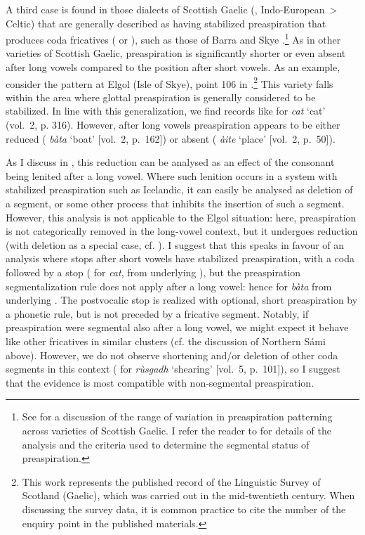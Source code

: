 \documentclass[output=paper,colorlinks,citecolor=brown]{langscibook}
\begin{document}
\largerpage
A third case is found in those dialects of Scottish Gaelic (, Indo\hyp European~> Celtic) that are generally described as having stabilized preaspiration that produces coda fricatives (\ipa{[h]} or \ipa{[x]}), such as those of Barra and Skye \parencite{borgstrøm1937barra, borgstrøm1941skye}.\footnote{See \textcite{bosch06:_revis_preas, omaolalaigh10} for a discussion of the range of variation in preaspiration patterning across varieties of Scottish Gaelic. I refer the reader to \textcite{iosad2019gaelic, iosad2020phonological} for details of the analysis and the criteria used to determine the segmental status of preaspiration.} As in other varieties of Scottish Gaelic, preaspiration is significantly shorter or even absent after long vowels compared to the position after short vowels. As an example, consider the pattern at Elgol (Isle of Skye), point 106 in  \textcite{sgds}.\footnote{This work represents the published record of the Linguistic Survey of Scotland (Gaelic), which was carried out in the mid-twentieth century. When discussing the survey data, it is common practice to cite the number of the enquiry point in the published materials.} This variety falls within the area where glottal preaspiration is generally considered to be  stabilized. In line with this generalization, we find records like  for \textit{cat} `cat' (vol.~2, p. 316). However, after long vowels preaspiration appears to be either reduced ( \textit{bàta} `boat' [vol.~2, p.~162]) or absent ( \textit{àite} `place' [vol.~2, p.~50]).

As I discuss in \textcite{iosad2020phonological}, this reduction can be analysed as an effect of the consonant being lenited after a long vowel. Where such lenition occurs in a system with stabilized preaspiration such as Icelandic, it can easily be analysed as deletion of a \ipa{[h]} segment, or some other process that inhibits the insertion of such a segment. However, this analysis is not applicable to the Elgol situation: here, preaspiration is not categorically removed in the long\hyp vowel context, but it undergoes reduction (with deletion as a special case, cf. \citealt{hejná2019pre}). I suggest that this speaks in favour of an analysis where stops after short vowels have stabilized preaspiration, with a coda \ipa{[h]} followed by a stop (\ipa{[kʰaht]} for \textit{cat}, from underlying ), but the preaspiration segmentalization rule does not apply after a long vowel: hence \ipa{[paːtʰə]} for \textit{bàta} from underlying . The postvocalic {\VOICELESS} stop is realized with optional, short preaspiration by a phonetic rule, but is not preceded by a fricative segment. Notably, if preaspiration were segmental also after a long vowel, we might expect it behave like other fricatives in similar clusters (cf. the discussion of Northern Sámi above). However, we do not observe shortening and/or deletion of other coda segments in this context ( for \textit{rùsgadh} `shearing' [vol.~5, p.~101]), so I suggest that the evidence is most compatible with non\hyp segmental preaspiration.
\end{document}
